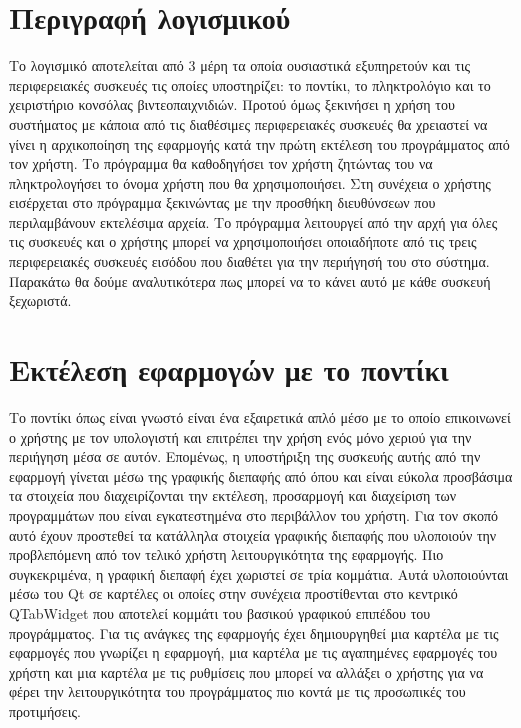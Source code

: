








\section{Περιγραφή λογισμικού}


Το λογισμικό αποτελείται από 3 μέρη τα οποία ουσιαστικά εξυπηρετούν και
τις περιφερειακές συσκευές τις οποίες υποστηρίζει: το ποντίκι, το πληκτρολόγιο και το χειριστήριο κονσόλας βιντεοπαιχνιδιών.
Προτού όμως ξεκινήσει η χρήση του συστήματος με κάποια από τις διαθέσιμες 
περιφερειακές συσκευές θα χρειαστεί να γίνει η αρχικοποίηση της εφαρμογής κατά
την πρώτη εκτέλεση του προγράμματος από τον χρήστη. Το πρόγραμμα θα καθοδηγήσει τον
χρήστη ζητώντας του να πληκτρολογήσει το όνομα χρήστη που θα χρησιμοποιήσει. Στη συνέχεια
ο χρήστης εισέρχεται στο πρόγραμμα ξεκινώντας
με την προσθήκη διευθύνσεων που περιλαμβάνουν εκτελέσιμα αρχεία. Το πρόγραμμα λειτουργεί
από την αρχή για όλες τις συσκευές και ο χρήστης μπορεί
να χρησιμοποιήσει οποιαδήποτε από τις τρεις περιφερειακές συσκευές εισόδου που διαθέτει
για την περιήγησή του στο σύστημα. Παρακάτω θα δούμε αναλυτικότερα πως μπορεί να το κάνει
αυτό με κάθε συσκευή ξεχωριστά.

\section{Εκτέλεση εφαρμογών με το ποντίκι}


Το ποντίκι όπως είναι γνωστό είναι ένα εξαιρετικά απλό μέσο με το οποίο επικοινωνεί
ο χρήστης με τον υπολογιστή και επιτρέπει την χρήση ενός μόνο χεριού για την περιήγηση
μέσα σε αυτόν. Επομένως, η υποστήριξη της συσκευής αυτής από την εφαρμογή γίνεται
μέσω της γραφικής διεπαφής από όπου και είναι εύκολα προσβάσιμα τα στοιχεία που
διαχειρίζονται την εκτέλεση, προσαρμογή και διαχείριση των προγραμμάτων που είναι
εγκατεστημένα στο περιβάλλον του χρήστη. Για τον σκοπό αυτό έχουν προστεθεί τα κατάλληλα
στοιχεία γραφικής διεπαφής που υλοποιούν την προβλεπόμενη από τον τελικό χρήστη 
λειτουργικότητα της εφαρμογής. Πιο συγκεκριμένα, η γραφική διεπαφή έχει χωριστεί σε τρία κομμάτια.
Αυτά υλοποιούνται μέσω του Qt σε καρτέλες οι οποίες στην συνέχεια προστίθενται στο
κεντρικό QTabWidget που αποτελεί κομμάτι του βασικού γραφικού επιπέδου του προγράμματος.
Για τις ανάγκες της εφαρμογής έχει δημιουργηθεί μια καρτέλα με τις εφαρμογές που γνωρίζει
η εφαρμογή, μια καρτέλα με τις αγαπημένες εφαρμογές του χρήστη και μια καρτέλα με τις
ρυθμίσεις που μπορεί να αλλάξει ο χρήστης για να φέρει την λειτουργικότητα του προγράμματος
πιο κοντά με τις προσωπικές του προτιμήσεις.

